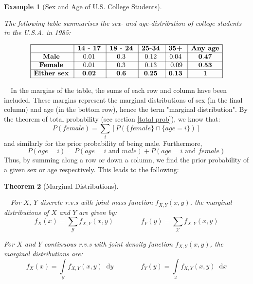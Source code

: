 \documentclass[12pt,a4paper]{article}
\newtheorem{thm}{Theorem}[subsection]
\newtheorem{ex}[thm]{Example}
\newcommand{\diff}{\;\mathrm{d}}
\begin{document}
\begin{ex}[Sex and Age of U.S. College Students]$\;$\par
\vspace{1cm}

The following table summarises the sex- and age-distribution of college students in the U.S.A. in 1985:

\begin{center}
$$\begin{array}{|c|c|c|c|c|c|} \hline
\quad & \textbf{14 - 17} \; & \textbf{18 - 24} \; & \textbf{25-34} \; & \textbf{35+}\; & \mbox{{\bf Any age}}\\ \hline
\text{{\bf Male}}\; & 0.01\; & 0.3\; & 0.12\; & 0.04\; & \mathbf{0.47} \\ \hline
\mbox{{\bf Female}}\; & 0.01\; & 0.3\; & 0.13\; & 0.09 & \mathbf{0.53}\\ \hline
\mbox{{\bf Either sex}}\; & \mathbf{0.02}\; & \mathbf{0.6}\; & \mathbf{0.25} \; & \mathbf{0.13}\; & \mathbf{1}\\ \hline
\end{array}$$
\end{center}

\end{ex}
$\quad$In the margins of the table, the sums of each row and column have been included. These margins represent the marginal distributions of sex (in the final column) and age (in the bottom row), hence the term "marginal distribution". By the theorem of total probability (see section \ref{total prob}), we know that:
$$P(female) = \sum\limits_i [P(\{female\} \cap \{age = i\})]$$
and similarly for the prior probability of being male. Furthermore,
$$P(age = i) = P(age = i \text{ and } male) +P(age = i \text{ and } female)$$
Thus, by summing along a row or down a column, we find the prior probability of a given sex or age respectively. This leads to the following:

\begin{thm}[Marginal Distributions]$\quad$\par
\vspace{1cm}

$\quad$For $X$, $Y$ discrete r.v.s with joint mass function $f_{X,Y}(x,y)$, the marginal distributions of $X$ and $Y$ are given by:
$$f_X(x) = \sum\limits_{\mathcal{Y}} f_{X,Y}(x,y) \qquad\qquad f_Y(y) = \sum\limits_{\mathcal{X}} f_{X,Y}(x,y)$$

For $X$ and $Y$ continuous r.v.s with joint density function $f_{X,Y}(x,y)$, the marginal distributions are:
$$f_X(x) = \int\limits_{\mathcal{Y}}\!\! f_{X,Y}(x,y)\; \diff y \qquad\qquad f_Y(y) = \int\limits_{\mathcal{X}} \!\! f_{X,Y}(x,y)\; \diff x$$

\end{thm}
\end{document}
